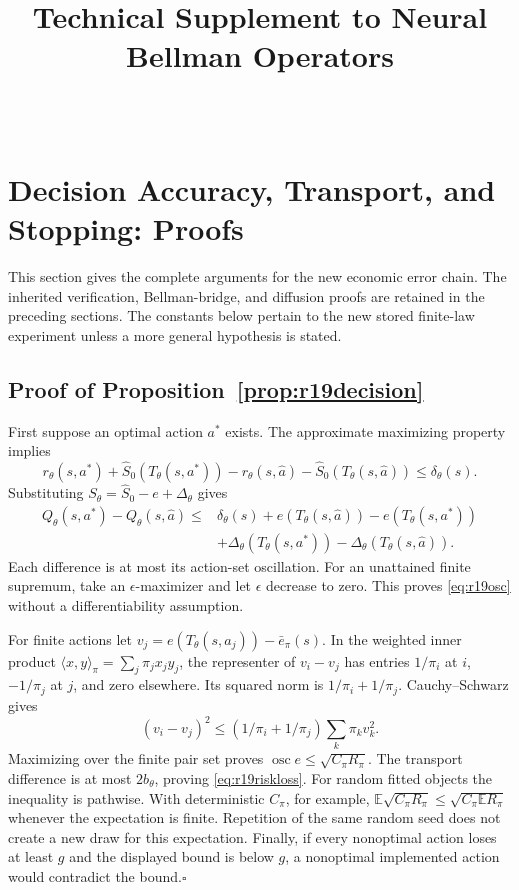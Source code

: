 \documentclass[ecta,nameyear,draft]{econsocart}
\theoremstyle{definition}
\theoremstyle{remark}
\newcommand{\E}{\mathbb E}
\begin{document}
\begin{frontmatter}
\title{Technical Supplement to Neural Bellman Operators}
\begin{aug}
\author[id=au1,addressref={add1}]{~}
\address[id=add1]{Peking University}
\end{aug}
\end{frontmatter}
\section{Decision Accuracy, Transport, and Stopping: Proofs}\label{app:r19proofs}
This section gives the complete arguments for the new economic error chain.
The inherited verification, Bellman-bridge, and diffusion proofs are retained
in the preceding sections. The constants below pertain to the new stored
finite-law experiment unless a more general hypothesis is stated.

\subsection{Proof of Proposition~\ref{prop:r19decision}}
First suppose an optimal action $a^*$ exists. The approximate maximizing
property implies
\[
 r_\theta(s,a^*)+\widehat S_0(T_\theta(s,a^*))
 -r_\theta(s,\widehat a)-\widehat S_0(T_\theta(s,\widehat a))
 \leq\delta_\theta(s).
\]
Substituting $S_\theta=\widehat S_0-e+\Delta_\theta$ gives
\begin{align*}
 Q_\theta(s,a^*)-Q_\theta(s,\widehat a)
 \leq {}&\delta_\theta(s)
       +e(T_\theta(s,\widehat a))-e(T_\theta(s,a^*))\\
       &+\Delta_\theta(T_\theta(s,a^*))
                -\Delta_\theta(T_\theta(s,\widehat a)).
\end{align*}
Each difference is at most its action-set oscillation. For an unattained
finite supremum, take an $\epsilon$-maximizer and let $\epsilon$ decrease
to zero. This proves \eqref{eq:r19osc} without a differentiability assumption.

For finite actions let $v_j=e(T_\theta(s,a_j))-\bar e_\pi(s)$.
In the weighted inner product $\langle x,y\rangle_\pi=\sum_j\pi_jx_jy_j$,
the representer of $v_i-v_j$ has entries $1/\pi_i$ at $i$, $-1/\pi_j$
at $j$, and zero elsewhere. Its squared norm is $1/\pi_i+1/\pi_j$.
Cauchy--Schwarz gives
\[
 (v_i-v_j)^2\leq(1/\pi_i+1/\pi_j)\sum_k\pi_kv_k^2.
\]
Maximizing over the finite pair set proves
$\operatorname{osc}e\leq\sqrt{C_\pi R_\pi}$. The transport difference is
at most $2b_\theta$, proving \eqref{eq:r19riskloss}. For random fitted
objects the inequality is pathwise. With deterministic $C_\pi$, for example,
$\E\sqrt{C_\pi R_\pi}\leq\sqrt{C_\pi\E R_\pi}$ whenever the expectation
is finite. Repetition of the same random seed does not create a new draw
for this expectation. Finally, if every nonoptimal action loses at least
$g$ and the displayed bound is below $g$, a nonoptimal implemented action
would contradict the bound.\hfill$\square$
\end{document}
